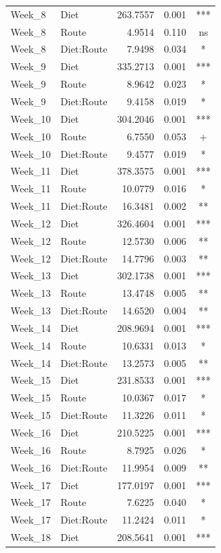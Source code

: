 \documentclass[
  12pt,
  letterpaper,
]{article}
\begin{document}
\begin{longtable}{l|lrrc}
Week\_8 & Diet & 263.7557 & 0.001 & *** \\ 
Week\_8 & Route & 4.9514 & 0.110 & ns \\ 
Week\_8 & Diet:Route & 7.9498 & 0.034 & * \\ 
Week\_9 & Diet & 335.2713 & 0.001 & *** \\ 
Week\_9 & Route & 8.9642 & 0.023 & * \\ 
Week\_9 & Diet:Route & 9.4158 & 0.019 & * \\ 
Week\_10 & Diet & 304.2046 & 0.001 & *** \\ 
Week\_10 & Route & 6.7550 & 0.053 & + \\ 
Week\_10 & Diet:Route & 9.4577 & 0.019 & * \\ 
Week\_11 & Diet & 378.3575 & 0.001 & *** \\ 
Week\_11 & Route & 10.0779 & 0.016 & * \\ 
Week\_11 & Diet:Route & 16.3481 & 0.002 & ** \\ 
Week\_12 & Diet & 326.4604 & 0.001 & *** \\ 
Week\_12 & Route & 12.5730 & 0.006 & ** \\ 
Week\_12 & Diet:Route & 14.7796 & 0.003 & ** \\ 
Week\_13 & Diet & 302.1738 & 0.001 & *** \\ 
Week\_13 & Route & 13.4748 & 0.005 & ** \\ 
Week\_13 & Diet:Route & 14.6520 & 0.004 & ** \\ 
Week\_14 & Diet & 208.9694 & 0.001 & *** \\ 
Week\_14 & Route & 10.6331 & 0.013 & * \\ 
Week\_14 & Diet:Route & 13.2573 & 0.005 & ** \\ 
Week\_15 & Diet & 231.8533 & 0.001 & *** \\ 
Week\_15 & Route & 10.0367 & 0.017 & * \\ 
Week\_15 & Diet:Route & 11.3226 & 0.011 & * \\ 
Week\_16 & Diet & 210.5225 & 0.001 & *** \\ 
Week\_16 & Route & 8.7925 & 0.026 & * \\ 
Week\_16 & Diet:Route & 11.9954 & 0.009 & ** \\ 
Week\_17 & Diet & 177.0197 & 0.001 & *** \\ 
Week\_17 & Route & 7.6225 & 0.040 & * \\ 
Week\_17 & Diet:Route & 11.2424 & 0.011 & * \\ 
Week\_18 & Diet & 208.5641 & 0.001 & *** \\ 

\end{longtable}
\end{document}
